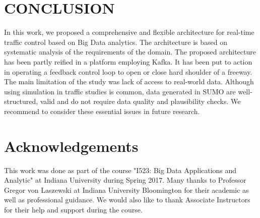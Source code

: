\documentclass[sigconf]{acmart}
\begin{document}
\section{CONCLUSION}
In this work, we proposed a comprehensive and flexible architecture for real-time traffic control based on Big Data analytics. The architecture is based on systematic analysis of the requirements of the domain. The proposed architecture has been partly reified in a platform employing Kafka. It has been put to action in operating a feedback control loop to open or close hard shoulder of a freeway. The main limitation of the study was lack of access to real-world data. Although using simulation in traffic studies is common, data generated in SUMO are well-structured, valid and do not require data quality and plausibility checks. We recommend to consider these essential issues in future research.

\section*{Acknowledgements}

This work was done as part of the course "I523: Big Data Applications and Analytic" at Indiana University during Spring 2017. Many thanks to Professor Gregor von Laszewski at Indiana University Bloomington for their academic as well as professional guidance. We would also like to thank Associate Instructors for their help and support during the course. 



\end{document}
